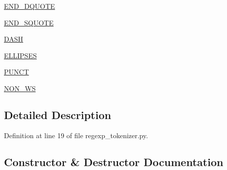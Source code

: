 \begin{DoxyCompactItemize}
\hyperlink{classparlai_1_1agents_1_1tfidf__retriever_1_1tokenizers_1_1regexp__tokenizer_1_1RegexpTokenizer_a0c6b2b10f26777981d15d3d065ef6a74}{E\+N\+D\+\_\+\+D\+Q\+U\+O\+TE}
\item 
\hyperlink{classparlai_1_1agents_1_1tfidf__retriever_1_1tokenizers_1_1regexp__tokenizer_1_1RegexpTokenizer_a1a609677f05370caba9bb3563928ab5b}{E\+N\+D\+\_\+\+S\+Q\+U\+O\+TE}
\item 
\hyperlink{classparlai_1_1agents_1_1tfidf__retriever_1_1tokenizers_1_1regexp__tokenizer_1_1RegexpTokenizer_ab618d62f360883bd2f7015df3100ffa5}{D\+A\+SH}
\item 
\hyperlink{classparlai_1_1agents_1_1tfidf__retriever_1_1tokenizers_1_1regexp__tokenizer_1_1RegexpTokenizer_a0b7ff076f78e4f5f9eea6fd46f8a6bb6}{E\+L\+L\+I\+P\+S\+ES}
\item 
\hyperlink{classparlai_1_1agents_1_1tfidf__retriever_1_1tokenizers_1_1regexp__tokenizer_1_1RegexpTokenizer_a495720390e80383e9a26faafb8834568}{P\+U\+N\+CT}
\item 
\hyperlink{classparlai_1_1agents_1_1tfidf__retriever_1_1tokenizers_1_1regexp__tokenizer_1_1RegexpTokenizer_a291b19b3a87547ad5a8563ede01d6cba}{N\+O\+N\+\_\+\+WS}
\end{DoxyCompactItemize}


\subsection{Detailed Description}


Definition at line 19 of file regexp\+\_\+tokenizer.\+py.



\subsection{Constructor \& Destructor Documentation}
\mbox{\label{classparlai_1_1agents_1_1tfidf__retriever_1_1tokenizers_1_1regexp__tokenizer_1_1RegexpTokenizer_af18fd6e3cb635cf6a05f32b90fb51fcc}} 
